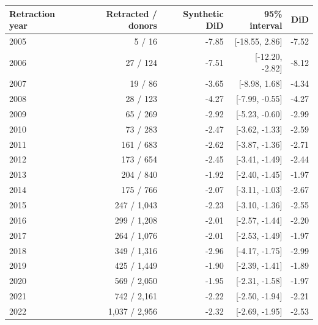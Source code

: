 
\begin{tabular}[t]{lrrrr}
\toprule
Retraction year & Retracted / donors & Synthetic DiD & 95\% interval & DiD\\
\midrule
2005 & 5 / 16 & -7.85 & {}[-18.55, 2.86] & -7.52\\
2006 & 27 / 124 & -7.51 & {}[-12.20, -2.82] & -8.12\\
2007 & 19 / 86 & -3.65 & {}[-8.98, 1.68] & -4.34\\
2008 & 28 / 123 & -4.27 & {}[-7.99, -0.55] & -4.27\\
2009 & 65 / 269 & -2.92 & {}[-5.23, -0.60] & -2.99\\
2010 & 73 / 283 & -2.47 & {}[-3.62, -1.33] & -2.59\\
2011 & 161 / 683 & -2.62 & {}[-3.87, -1.36] & -2.71\\
2012 & 173 / 654 & -2.45 & {}[-3.41, -1.49] & -2.44\\
2013 & 204 / 840 & -1.92 & {}[-2.40, -1.45] & -1.97\\
2014 & 175 / 766 & -2.07 & {}[-3.11, -1.03] & -2.67\\
2015 & 247 / 1,043 & -2.23 & {}[-3.10, -1.36] & -2.55\\
2016 & 299 / 1,208 & -2.01 & {}[-2.57, -1.44] & -2.20\\
2017 & 264 / 1,076 & -2.01 & {}[-2.53, -1.49] & -1.97\\
2018 & 349 / 1,316 & -2.96 & {}[-4.17, -1.75] & -2.99\\
2019 & 425 / 1,449 & -1.90 & {}[-2.39, -1.41] & -1.89\\
2020 & 569 / 2,050 & -1.95 & {}[-2.31, -1.58] & -1.97\\
2021 & 742 / 2,161 & -2.22 & {}[-2.50, -1.94] & -2.21\\
2022 & 1,037 / 2,956 & -2.32 & {}[-2.69, -1.95] & -2.53\\
\bottomrule
\end{tabular}
